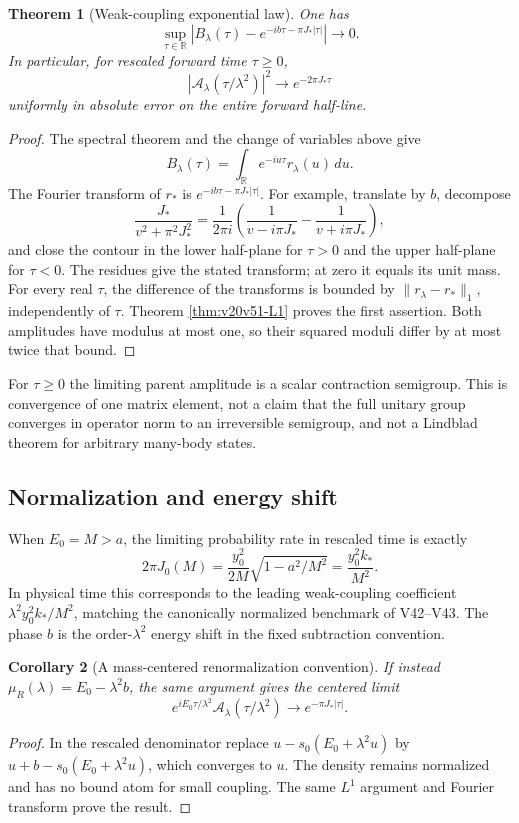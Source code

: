 \documentclass[11pt]{article}
\newtheorem{theorem}{Theorem}[section]
\newtheorem{corollary}[theorem]{Corollary}
\theoremstyle{remark}
\begin{document}
\begin{theorem}[Weak-coupling exponential law]
\label{thm:v20v51-exponential}
One has
\[
 \sup_{\tau\in\mathbb R}
 \left|B_\lambda(\tau)-
       e^{-ib\tau-\pi J_*|\tau|}\right|\longrightarrow0.
\]
In particular, for rescaled forward time \(\tau\geq0\),
\[
 |\mathcal A_\lambda(\tau/\lambda^2)|^2
 \longrightarrow e^{-2\pi J_*\tau}
\]
uniformly in absolute error on the entire forward half-line.
\end{theorem}
\begin{proof}
The spectral theorem and the change of variables above give
\[
 B_\lambda(\tau)=\int_{\mathbb R}e^{-iu\tau}r_\lambda(u)\,du.
\]
The Fourier transform of \(r_*\) is
\(e^{-ib\tau-\pi J_*|\tau|}\).
For example, translate by \(b\), decompose
\[
 \frac{J_*}{v^2+\pi^2J_*^2}
 =\frac1{2\pi i}
 \left(\frac1{v-i\pi J_*}-\frac1{v+i\pi J_*}\right),
\]
and close the contour in the lower half-plane for \(\tau>0\)
and the upper half-plane for \(\tau<0\).  The residues give
the stated transform; at zero it equals its unit mass.
For every real \(\tau\), the difference of the transforms is
bounded by \(\|r_\lambda-r_*\|_1\), independently of \(\tau\).
Theorem \ref{thm:v20v51-L1} proves the first assertion.
Both amplitudes have modulus at most one, so their squared
moduli differ by at most twice that bound.
\end{proof}

For \(\tau\geq0\) the limiting parent amplitude is a scalar
contraction semigroup.  This is convergence of one matrix element,
not a claim that the full unitary group converges in operator norm
to an irreversible semigroup, and not a Lindblad theorem for
arbitrary many-body states.

\subsection{Normalization and energy shift}

When \(E_0=M>a\), the limiting probability rate in rescaled
time is exactly
\[
 2\pi J_0(M)=\frac{y_0^2}{2M}\sqrt{1-a^2/M^2}
 =\frac{y_0^2 k_*}{M^2}.
\]
In physical time this corresponds to the leading weak-coupling
coefficient \(\lambda^2 y_0^2k_*/M^2\), matching the
canonically normalized benchmark of V42--V43.
The phase \(b\) is the order-\(\lambda^2\) energy shift in
the fixed subtraction convention.

\begin{corollary}[A mass-centered renormalization convention]
\label{cor:v20v51-shift}
If instead \(\mu_R(\lambda)=E_0-\lambda^2b\), the same
argument gives the centered limit
\[
 e^{iE_0\tau/\lambda^2}\mathcal A_\lambda(\tau/\lambda^2)
 \longrightarrow e^{-\pi J_*|\tau|}.
\]
\end{corollary}
\begin{proof}
In the rescaled denominator replace
\(u-s_0(E_0+\lambda^2u)\) by
\(u+b-s_0(E_0+\lambda^2u)\), which converges to \(u\).
The density remains normalized and has no bound atom for
small coupling.  The same \(L^1\) argument and Fourier
transform prove the result.
\end{proof}
\end{document}
